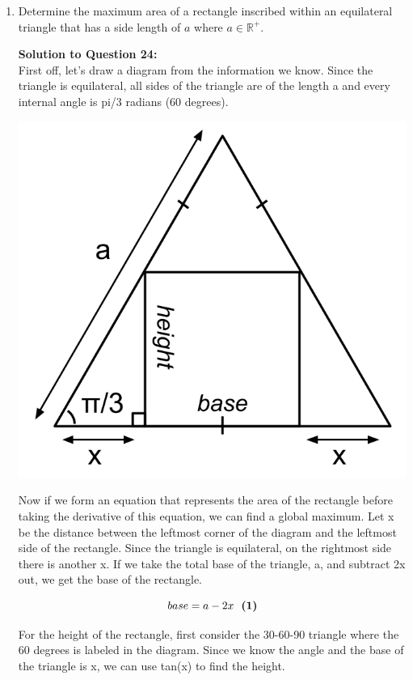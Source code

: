 \documentclass[12pt]{book}
\begin{document}
\begin{enumerate}
\newpage


\item Determine the maximum area of a rectangle inscribed within an equilateral triangle that has a side length of $a$ where $a \in \mathbb{R^+}$. 

\vspace{0.3cm} 
\textbf{Solution to Question 24:}\\
First off, let's draw a diagram from the information we know. Since the 
triangle is equilateral, all sides of the triangle are of the length a and 
every internal angle is pi/3 radians (60 degrees).  

\begin{center}
    \includegraphics[scale = 0.32]{Q24 Diagram.png}
\end{center}

Now if we form an equation that represents the area of the rectangle 
before taking the derivative of this equation, we can find a global 
maximum. Let x be the distance between the leftmost corner of the diagram and the 
leftmost side of the rectangle. Since the triangle is equilateral, 
on the rightmost side there is another x. If we take the total base 
of the triangle, a, and subtract 2x out, we get the base of the rectangle.

$$base = a - 2x \text{\space \space \textbf{(1)}}$$

For the height of the rectangle, first consider the 30-60-90 triangle 
where the 60 degrees is labeled in the diagram. Since we know the angle 
and the base of the triangle is x, we can use tan(x) to find the height.


\end{enumerate}
\end{document}
